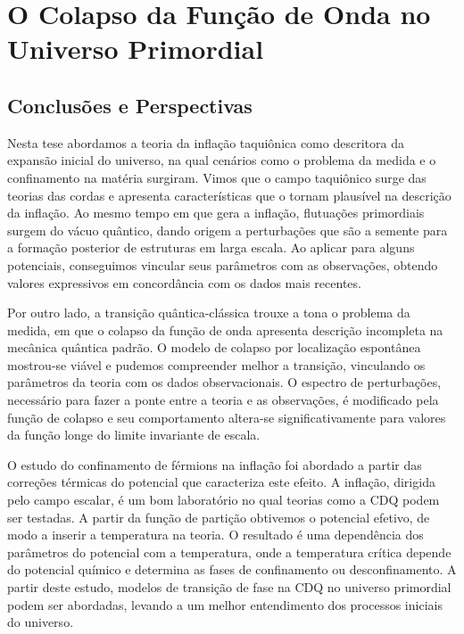 \documentclass[
	12pt,				%
	openright,			%
	oneside,			%
	a4paper,			%
	english,			%
	french,				%
	spanish,			%
	brazil				%
	]{abntex2}
\begin{document}
\part{O Colapso da Função de Onda no Universo Primordial}







\chapter*[CONCLUSÕES E PERSPECTIVAS]{Conclusões e Perspectivas}
Nesta tese abordamos a teoria da inflação taquiônica como descritora da expansão inicial do universo, na qual cenários como o problema da 
medida e o confinamento na matéria surgiram. Vimos que o campo taquiônico surge das teorias das cordas e apresenta características que o tornam plausível na descrição da inflação. Ao mesmo tempo em que gera a inflação, flutuações primordiais surgem do vácuo quântico, dando origem a perturbações que são a semente para a formação posterior de estruturas em larga escala. Ao aplicar para alguns potenciais, conseguimos vincular seus parâmetros com as observações, obtendo valores expressivos em concordância com os dados mais recentes. 

Por outro lado, a transição quântica-clássica trouxe a tona o problema da medida, em que o colapso da função de onda apresenta descrição incompleta na mecânica quântica padrão. O modelo de colapso por localização espontânea mostrou-se viável e pudemos compreender melhor a transição, vinculando os parâmetros da teoria com os dados observacionais. O espectro de perturbações, necessário para fazer a ponte entre a teoria e as observações, é modificado pela função de colapso e seu comportamento altera-se significativamente para valores da função longe do limite invariante de escala. 

O estudo do confinamento de férmions na inflação foi abordado a partir das correções térmicas do potencial que caracteriza este efeito. A inflação, dirigida pelo campo escalar, é um bom laboratório no qual teorias como a CDQ podem ser testadas. A partir da função de partição obtivemos o potencial efetivo, de modo a inserir a temperatura na teoria. O resultado é uma dependência dos parâmetros do potencial com a temperatura, onde a temperatura crítica depende do potencial químico e determina as fases de confinamento ou desconfinamento. A partir deste estudo, modelos de transição de fase na CDQ no universo primordial podem ser abordadas, levando a um melhor entendimento dos processos iniciais do universo.
\postextual
\end{document}
